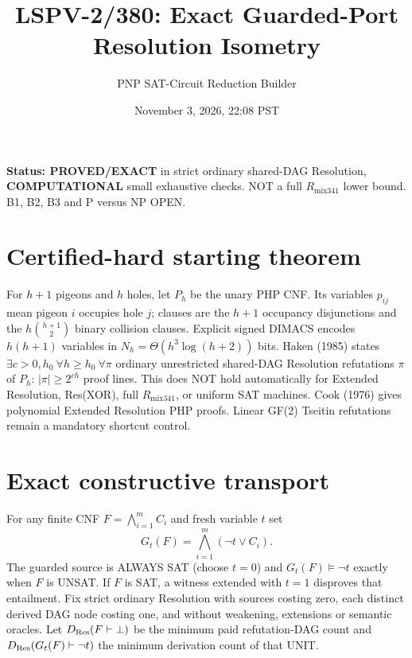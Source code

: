 \documentclass[11pt]{article}
\title{LSPV-2/380: Exact Guarded-Port Resolution Isometry}
\author{PNP SAT-Circuit Reduction Builder}
\date{November 3, 2026, 22:08 PST}
\begin{document}
\maketitle
\noindent\textbf{Status: PROVED/EXACT} in strict ordinary shared-DAG Resolution, \textbf{COMPUTATIONAL} small exhaustive checks. NOT a full $R_{\mathrm{mix341}}$ lower bound. B1, B2, B3 and P versus NP OPEN.

\section*{Certified-hard starting theorem}
For $h+1$ pigeons and $h$ holes, let $P_h$ be the unary PHP CNF. Its variables $p_{ij}$ mean pigeon $i$ occupies hole $j$; clauses are the $h+1$ occupancy disjunctions and the $h\binom{h+1}{2}$ binary collision clauses. Explicit signed DIMACS encodes $h(h+1)$ variables in $N_h=\Theta(h^3\log(h+2))$ bits. Haken (1985) states $\exists c>0,h_0\ \forall h\ge h_0\ \forall\pi$ ordinary unrestricted shared-DAG Resolution refutations $\pi$ of $P_h$: $|\pi|\ge2^{ch}$ proof lines. This does NOT hold automatically for Extended Resolution, Res(XOR), full $R_{\mathrm{mix341}}$, or uniform SAT machines. Cook (1976) gives polynomial Extended Resolution PHP proofs. Linear GF(2) Tseitin refutations remain a mandatory shortcut control.

\section*{Exact constructive transport}
For any finite CNF $F=\bigwedge_{i=1}^m C_i$ and fresh variable $t$ set
\[
G_t(F)=\bigwedge_{i=1}^m(\neg t\lor C_i).
\]
The guarded source is ALWAYS SAT (choose $t=0$) and $G_t(F)\models\neg t$ exactly when $F$ is UNSAT. If $F$ is SAT, a witness extended with $t=1$ disproves that entailment.
Fix strict ordinary Resolution with sources costing zero, each distinct derived DAG node costing one, and without weakening, extensions or semantic oracles. Let $D_{\rm Res}(F\vdash\bot)$ be the minimum paid refutation-DAG count and $D_{\rm Res}(G_t(F)\vdash\neg t)$ the minimum derivation count of that UNIT.
\end{document}
